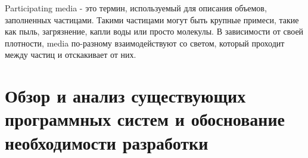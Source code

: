 Participating media - это термин, используемый для описания объемов, заполненных частицами. Такими частицами могут быть крупные примеси,
такие как пыль, загрязнение, капли воды или просто молекулы.
В зависимости от своей плотности, media по-разному взаимодействуют со светом, который проходит между частиц и отскакивает от них.

\section{Обзор и анализ существующих программных систем и обоснование необходимости разработки}
